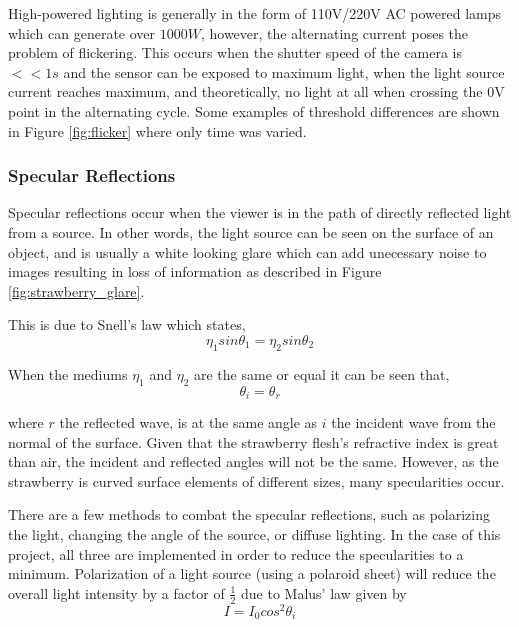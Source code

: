 \documentclass[fleqn,twoside]{article}
\begin{document}
High-powered lighting is generally in the form of 110V/220V AC powered lamps which can generate over $1000W$, however, the alternating current poses the problem of flickering. This occurs when the shutter speed of the camera is $<<1s$ and the sensor can be exposed to maximum light, when the light source current reaches maximum, and theoretically, no light at all when crossing the 0V point in the alternating cycle. Some examples of threshold differences are shown in Figure \ref{fig:flicker} where only time was varied.



\subsubsection{Specular Reflections}

Specular reflections occur when the viewer is in the path of directly reflected light from a source. In other words, the light source can be seen on the surface of an object, and is usually a white looking glare which can add unecessary noise to images resulting in loss of information as described in Figure \ref{fig:strawberry_glare}.

This is due to Snell's law which states,
\begin{equation}
\eta_{1} sin\theta_{1} = \eta_{2} sin\theta_{2}
\end{equation}

When the mediums $\eta_{1}$ and  $\eta_{2}$ are the same or equal it can be seen that,
\begin{equation}
\theta_{i} = \theta_{r}
\end{equation}

where $r$ the reflected wave, is at the same angle as $i$ the incident wave from the normal of the surface. Given that the strawberry flesh's refractive index is great than air, the incident and reflected angles will not be the same. However, as the strawberry is curved surface elements of different sizes, many specularities occur. 

There are a few methods to combat the specular reflections, such as polarizing the light, changing the angle of the source, or diffuse lighting. In the case of this project, all three are implemented in order to reduce the specularities to a minimum. Polarization of a light source (using a polaroid sheet) will reduce the overall light intensity by a factor of $\frac{1}{2}$ due to Malus' law given by
\begin{equation}
	I = I_{0} cos^{2}\theta_{i}
\end{equation}
\end{document}
